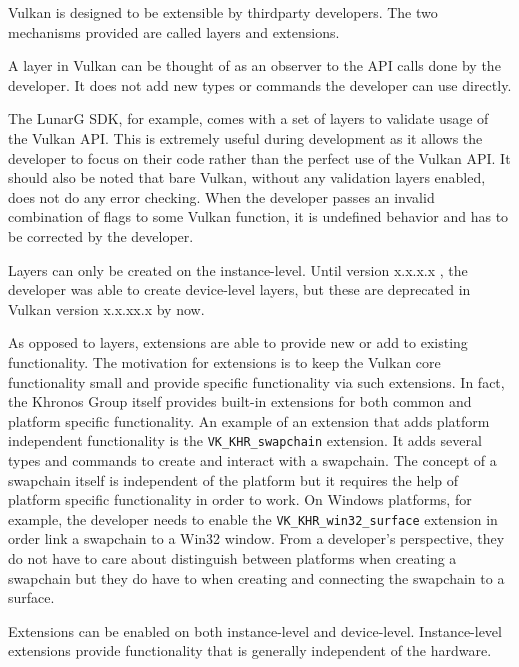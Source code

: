     Vulkan is designed to be extensible by thirdparty developers. The two mechanisms provided are called layers and extensions.

    A layer in Vulkan can be thought of as an observer to the API calls done by the developer. It does not add new types or commands the developer can use directly.

    The LunarG SDK, for example, comes with a set of layers to validate usage of the Vulkan API. This is extremely useful during development as it allows the developer to focus on their code rather than the perfect use of the Vulkan API. It should also be noted that bare Vulkan, without any validation layers enabled, does not do any error checking. When the developer passes an invalid combination of flags to some Vulkan function, it is undefined behavior and has to be corrected by the developer.

    Layers can only be created on the instance-level. Until version x.x.x.x , the developer was able to create device-level layers, but these are deprecated in Vulkan version x.x.xx.x by now.


    As opposed to layers, extensions are able to provide new or add to existing functionality. The motivation for extensions is to keep the Vulkan core functionality small and provide specific functionality via such extensions. In fact, the Khronos Group itself provides built-in extensions for both common and platform specific functionality. An example of an extension that adds platform independent functionality is the \lstinline{VK_KHR_swapchain} extension. It adds several types and commands to create and interact with a swapchain. The concept of a swapchain itself is independent of the platform but it requires the help of platform specific functionality in order to work. On Windows platforms, for example, the developer needs to enable the \lstinline{VK_KHR_win32_surface} extension in order link a swapchain to a Win32 window. From a developer's perspective, they do not have to care about distinguish between platforms when creating a swapchain but they do have to when creating and connecting the swapchain to a surface.

    Extensions can be enabled on both instance-level and device-level. Instance-level extensions provide functionality that is generally independent of the hardware.

